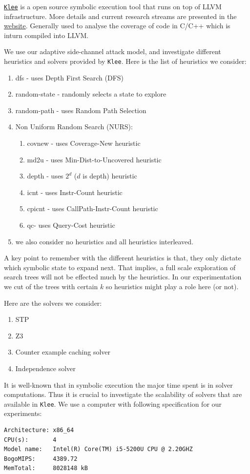 \documentclass[11pt,a4paper,notitlepage]{article}
\begin{document}
\href{https://klee.github.io/}{\texttt{Klee}} is a open source symbolic execution tool that runs on top of LLVM infrastructure.
More details and current research streams are presented in the \href{https://klee.github.io/publications/}{website}.
Generally used to analyse the coverage of code in C/C++ which is inturn compiled into LLVM. 

We use our adaptive side-channel attack model, and investigate different heuristics and solvers provided by \texttt{Klee}.
Here is the list of heuristics we consider:
\begin{enumerate}
\item dfs - uses Depth First Search (DFS)
\item random-state - randomly selects a state to explore
\item random-path - uses Random Path Selection
\item Non Uniform Random Search (NURS):
  \begin{enumerate}
  \item covnew - uses Coverage-New heuristic
  \item md2u - uses Min-Dist-to-Uncovered heuristic
  \item depth - uses $2^d$ ($d$ is depth) heuristic
  \item icnt - uses Instr-Count heuristic
  \item cpicnt - uses CallPath-Instr-Count heuristic
  \item qc- uses Query-Cost heuristic
  \end{enumerate}
\item we also consider no heuristics and all heuristics interleaved.
\end{enumerate}

A key point to remember with the different heuristics is that, they only dictate which symbolic state to expand next.
That implies, a full scale exploration of search trees will not be effected much by the heuristics.
In our experimentation we cut of the trees with certain $k$ so heuristics might play a role here (or not).

Here are the solvers we consider:
\begin{enumerate}
\item STP
\item Z3
\item Counter example  caching solver
\item Independence solver
\end{enumerate}

It is well-known that in symbolic execution the major time spent is in solver computations. Thus it is crucial to investigate the scalability of solvers that are available in \texttt{Klee}.
We use a computer with following specification for our experiments:
\begin{verbatim}
Architecture: x86_64
CPU(s):       4
Model name:   Intel(R) Core(TM) i5-5200U CPU @ 2.20GHZ
BogoMIPS:     4389.72
MemTotal:     8028148 kB
\end{verbatim}
\end{document}
